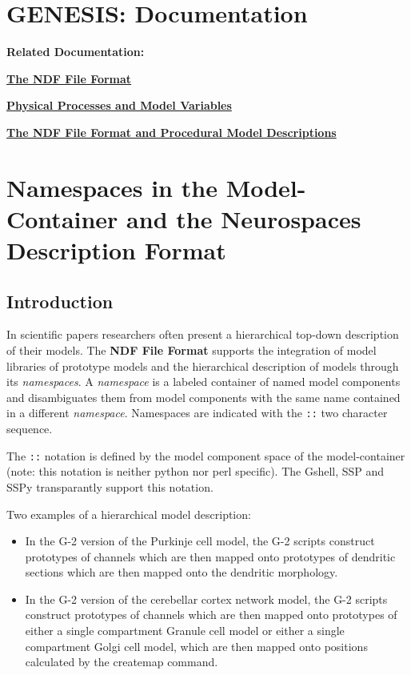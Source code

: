 \documentclass[12pt]{article}
\begin{document}
\section*{GENESIS: Documentation}

{\bf Related Documentation:}

\href{../ndf-file-format/ndf-file-format.tex}{\bf The NDF File Format}

\href{../model-variables/model-variables.tex}{\bf Physical Processes and Model Variables}

\href{../ndf-procedural-description/ndf-procedural-description.tex}{\bf The NDF File Format and Procedural Model Descriptions}


\section*{Namespaces in the Model-Container and the Neurospaces Description Format}

\subsection*{Introduction}
\label{sec:introduction}


In scientific papers researchers often present a hierarchical top-down
description of their models.  The {\bf NDF File Format} supports the
integration of model libraries of prototype models and the
hierarchical description of models through its {\it namespaces}.  A
{\it namespace} is a labeled container of named model components and
disambiguates them from model components with the same name contained
in a different {\it namespace}.  Namespaces are indicated with the
{\tt ::} two character sequence.

The {\tt ::} notation is defined by the model component space of the
model-container (note: this notation is neither python nor perl
specific).  The Gshell, SSP and SSPy transparantly support this
notation.


Two examples of a hierarchical model description:

\begin{itemize}
\item In the G-2 version of the Purkinje cell model, the G-2 scripts
  construct prototypes of channels which are then mapped onto
  prototypes of dendritic sections which are then mapped onto the
  dendritic morphology.

\item In the G-2 version of the cerebellar cortex network model, the
  G-2 scripts construct prototypes of channels which are then mapped
  onto prototypes of either a single compartment Granule cell model or
  either a single compartment Golgi cell model, which are then mapped
  onto positions calculated by the createmap command.
\end{itemize}
\end{document}
